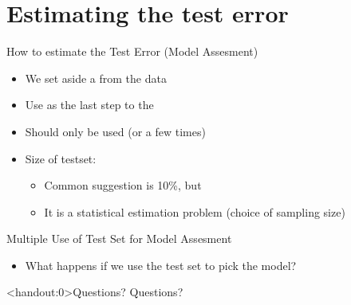 \documentclass[10pt]{beamer}
\begin{document}
\section{Estimating the test error}

\begin{frame}{How to estimate the Test Error (Model Assesment)}

\begin{itemize}
\item We set aside a  from the data
\item Use as the last step to  the 
\item Should only be used  (or a few times)\pause
\item Size of testset:
\begin{itemize}
\item Common suggestion is 10\%, but
\item It is a statistical estimation problem (choice of sampling size)
\end{itemize}
\end{itemize}

\end{frame}


\begin{frame}{Multiple Use of Test Set for Model Assesment}

\begin{itemize}
\item What happens if we use the test set to pick the model?

\end{itemize}

\end{frame}

\begin{frame}<handout:0>{Questions?}
Questions?
\end{frame}



\end{document}
